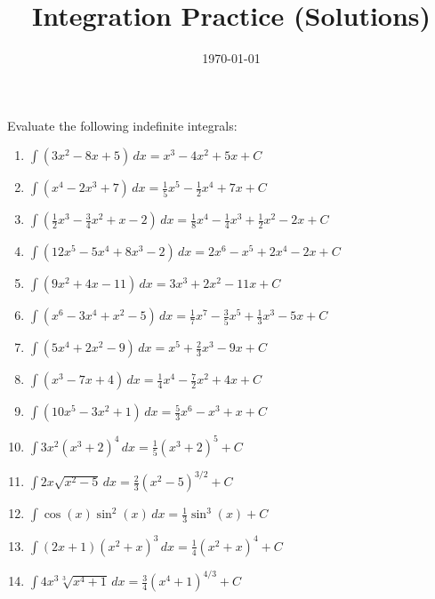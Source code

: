 \documentclass{article}
\begin{document}
\title{Integration Practice (Solutions)}
\date{\today}
\maketitle

Evaluate the following indefinite integrals:

\begin{enumerate}
\item $\int (3x^2 - 8x + 5) \, dx = x^3 - 4x^2 + 5x + C$ 
\item $\int (x^4 - 2x^3 + 7) \, dx = \frac{1}{5}x^5 - \frac{1}{2}x^4 + 7x + C$ 
\item $\int (\frac{1}{2}x^3 - \frac{3}{4}x^2 + x - 2) \, dx = \frac{1}{8}x^4 - \frac{1}{4}x^3 + \frac{1}{2}x^2 - 2x + C$ 
\item $\int (12x^5 - 5x^4 + 8x^3 - 2) \, dx = 2x^6 - x^5 + 2x^4 - 2x + C$  
\item $\int (9x^2 + 4x - 11) \, dx = 3x^3 + 2x^2 - 11x + C$ 
\item $\int (x^6 - 3x^4 + x^2 - 5) \, dx = \frac{1}{7}x^7 - \frac{3}{5}x^5 + \frac{1}{3}x^3 - 5x + C$  
\item $\int (5x^4 + 2x^2 - 9) \, dx = x^5 + \frac{2}{3}x^3 - 9x + C$
\item $\int (x^3 - 7x + 4) \, dx = \frac{1}{4}x^4 - \frac{7}{2}x^2 + 4x + C$
\item $\int (10x^5 - 3x^2 + 1) \, dx = \frac{5}{3}x^6 - x^3 + x + C$
\item $\int 3x^2 (x^3 + 2)^4 \, dx = \frac{1}{5}(x^3 + 2)^5 + C$ 
\item $\int 2x \sqrt{x^2 - 5} \, dx = \frac{2}{3}(x^2 - 5)^{3/2} + C$ 
\item $\int \cos(x) \sin^2(x) \, dx = \frac{1}{3}\sin^3(x) + C$ 
\item $\int  (2x + 1)(x^2 + x)^3 \, dx = \frac{1}{4}(x^2 + x)^4 + C$
\item $\int 4x^3 \sqrt[3]{x^4 + 1} \, dx = \frac{3}{4}(x^4 + 1)^{4/3} + C$
\end{enumerate}
\end{document}
